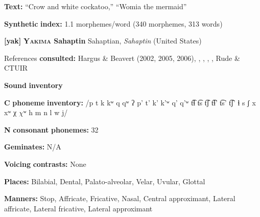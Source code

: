 \documentclass[output=paper]{langsci/langscibook}
\begin{document}
\begin{styleBody}
\textbf{Text:} “Crow and white cockatoo,” “Womia the mermaid” \citep[378-382]{Marmion2010}
\end{styleBody}

\begin{styleBody}
\textbf{Synthetic} \textbf{index:} 1.1 morphemes/word (340 morphemes, 313 words)
\end{styleBody}

\begin{styleBody}
\textbf{[yak]}   \textbf{\textsc{Yakima} \textbf{Sahaptin}}  Sahaptian, \textit{Sahaptin} (United States)
\end{styleBody}

\begin{styleBody}
References \textbf{consulted:} Hargus \& Beavert (2002, 2005, 2006), \citet{Jansen2010}, \citet{Minthorn2005}, \citet{RigsbyRude1996}, \citet{Rude2009}, Rude \& CTUIR 
\end{styleBody}

\begin{styleBody}
\textbf{Sound} \textbf{inventory}
\end{styleBody}

\begin{styleBody}
\textbf{C} \textbf{phoneme} \textbf{inventory:} /p t k kʷ q qʷ ʔ p’ t’ k’ k’ʷ q’ q’ʷ t͡ɬ t͡s t͡ʃ t͡ɬ’ t͡s’ t͡ʃ’ ɬ s ʃ x xʷ χ $\chi ʷ$ h m n l w j/
\end{styleBody}

\begin{styleBody}
\textbf{N} \textbf{consonant} \textbf{phonemes:} 32
\end{styleBody}

\begin{styleBody}
\textbf{Geminates:} N/A
\end{styleBody}

\begin{styleBody}
\textbf{Voicing} \textbf{contrasts:} None
\end{styleBody}

\begin{styleBody}
\textbf{Places:} Bilabial, Dental, Palato-alveolar, Velar, Uvular, Glottal
\end{styleBody}

\begin{styleBody}
\textbf{Manners:} Stop, Affricate, Fricative, Nasal, Central approximant, Lateral affricate, Lateral fricative, Lateral approximant
\end{styleBody}
\end{document}
